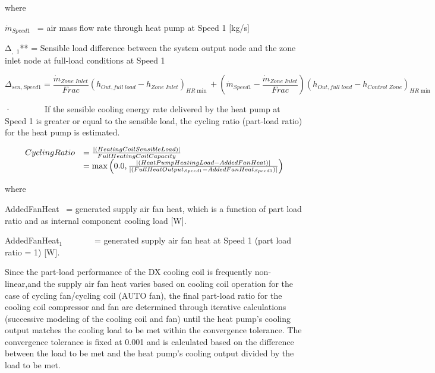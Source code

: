 where

\emph{\({{{\dot m}_{Speed1}}}\)}~ = air mass flow rate through heat pump at Speed 1 {[}kg/s{]}

Δ\(_{,}\) \(_{1}\)** = Sensible load difference between the system output node and the zone inlet node at full-load conditions at Speed 1

\begin{equation}
{\Delta_{sen,Speed1}} = \frac{{{{\dot m}_{Zone\;Inlet}}}}{{Frac}}{\left( {{h_{Out,full\;load}} - {h_{Zone\;Inlet}}} \right)_{HR\min }} + \left( {{{\dot m}_{Speed1}} - \frac{{{{\dot m}_{Zone\;Inlet}}}}{{Frac}}} \right){\left( {{h_{Out,full\;load}} - {h_{Control\;Zone}}} \right)_{HR\min }}
\end{equation}

·~~~~~~~~If the sensible cooling energy rate delivered by the heat pump at Speed 1 is greater or equal to the sensible load, the cycling ratio (part-load ratio) for the heat pump is estimated.

\begin{equation}
  \begin{array}{rl}
    CyclingRatio &= \frac{\left|\PB{HeatingCoilSensibleLoad}\right|}{FullHeatingCoilCapacity} \\
                 &= \max \PB{0.0, \frac{\left|\PB{HeatPumpHeatingLoad-AddedFanHeat}\right|}{\left|\PB{FullHeatOutput_{Speed1}-AddedFanHeat_{Speed1}}\right|} }
  \end{array}
\end{equation}

where

AddedFanHeat~ = generated supply air fan heat, which is a function of part load ratio and as internal component cooling load {[}W{]}.

AddedFanHeat\(_{1}\)~~~~~~~ = generated supply air fan heat at Speed 1 (part load ratio = 1) {[}W{]}.

Since the part-load performance of the DX cooling coil is frequently non-linear,and the supply air fan heat varies based on cooling coil operation for the case of cycling fan/cycling coil (AUTO fan), the final part-load ratio for the cooling coil compressor and fan are determined through iterative calculations (successive modeling of the cooling coil and fan) until the heat pump's cooling output matches the cooling load to be met within the convergence tolerance. The convergence tolerance is fixed at 0.001 and is calculated based on the difference between the load to be met and the heat pump's cooling output divided by the load to be met.

